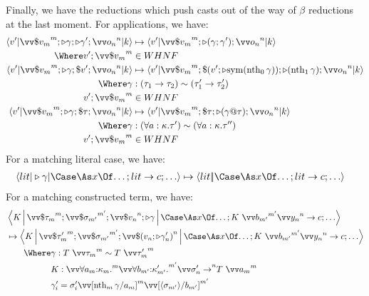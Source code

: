 \documentclass{article}
\begin{document}
Finally, we have the reductions which push casts out of the way of $\beta$
reductions at the last moment.  For applications, we have:
\begin{align*}
  \braket
  { \tm'
  | \vect[m]{\appto{\tm_m}}
    \then \castby{\cn}
    \then \castby{\cn'}
    \then \vect[n]{\frm_n}
  | \ko }
  &\sred
  \braket
  { \tm'
  | \vect[m]{\appto{\tm_m}}
    \then \castby{(\compcn{\cn}{\cn'})}
    \then \vect[n]{\frm_n}
  | \ko }
  \\
  \Where
  \tm'; \vect[m]{\appto{\tm_m}} &\in WHNF
  \\
  \braket
  { \tm'
  | \vect[m]{\appto{\tm_m}}
    \then \castby{\cn}
    \then \appto{\tm'}
    \then \vect[n]{\frm_n}
  | \ko }
  &\sred
  \braket
  { \tm'
  | \vect[m]{\appto{\tm_m}}
    \then \appto{(\tm' \then \castby{\sym(\nth_0 \cn)})}
    \then \castby{(\nth_1 \cn)}
    \then \vect[n]{\frm_n}
  | \ko }
  \\
  \Where
  \cn &: \eqty{(\ty_1 \to \ty_2)}{(\ty'_1 \to \ty'_2)}
  \\
  \tm'; \vect[m]{\appto{\tm_m}} &\in WHNF
  \\
  \braket
  { \tm'
  | \vect[m]{\appto{\tm_m}}
    \then \castby{\cn}
    \then \inst{\ty}
    \then \vect[n]{\frm_n}
  | \ko }
  &\sred
  \braket
  { \tm'
  | \vect[m]{\appto{\tm_m}}
    \then \inst{\ty}
    \then \castby{(\instancn{\cn}{\ty})}
    \then \vect[n]{\frm_n}
  | \ko }
  \\
  \Where
  \cn &: \eqty{(\forall a:\ki.\ty')}{(\forall a:\ki.\ty'')}
  \\
  \tm'; \vect[m]{\appto{\tm_m}} &\in WHNF
\end{align*}
For a matching literal case, we have:
\begin{align*}
  \braket{\lit | \castby{\cn} | \caseas{x}{\dots;\alt{\lit}{\cmd};\dots} }
  &\sred  
  \cut{\lit}{\caseas{x}{\dots;\alt{\lit}{\cmd};\dots}}
\end{align*}
For a matching constructed term, we have:
\begin{align*}
  &
  \Braket
  { K
  | \vect[m]{\inst{\ty_{m}}}
    \then \vect[m']{\inst{\sty_{m'}}}
    \then \vect[n]{\appto{\tm_{n}}}
    \then \castby{\cn}
  | \caseas{x}{\dots;\alt{K ~ \vect[m']{b_{m'}} \vect[n]{y_{n}}}{\cmd};\dots} }
  \\
  &\sred
  \Braket
  { K
  | \vect[m]{\inst{\ty'_{m}}}
    \then \vect[m']{\inst{\sty_{m'}}}
    \then \vect[n]{\appto{(\tm_{n} \then \castby{\cn'_n})}}
  | \caseas{x}{\dots;\alt{K ~ \vect[m']{b_{m'}} \vect[n]{y_{n}}}{\cmd};\dots} }
  \\
  &\qquad
  \Where
  \cn : \eqty{T ~ \vect[m]{\ty_{m}}}{T ~ \vect[m]{\ty'_{m}}}
  \\
  &\qquad\phantom{\Where}
  K 
  :
  \vect[m]{\forall\ann{a_{m}}{\ki_{m}}.}
  \vect[m']{\forall\ann{b_{m'}}{\ki'_{m'}}.}
  \vect[n]{\sty'_{n} \to} T ~ \vect[m]{a_{m}}
  \\
  &\qquad\phantom{\Where}
  \cn'_i
  =
  \sty'_i\vect[m]{\subst{a_{m}}{\nth_m \cn}}\vect[m']{\subst{b_{m'}}{\idcn{\sty_{m'}}}}
\end{align*}
\end{document}
